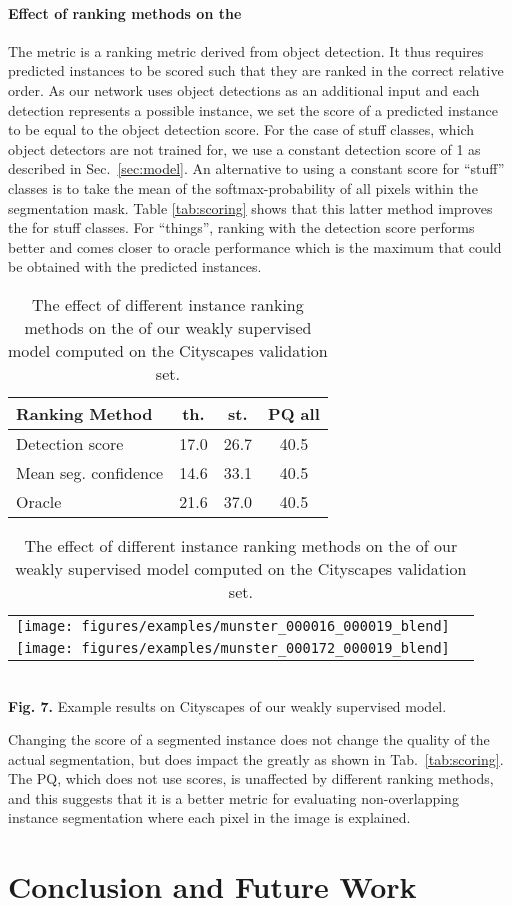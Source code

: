 \documentclass[runningheads]{llncs}
\begin{document}
\paragraph{Effect of ranking methods on the }
The  metric is a ranking metric derived from object detection.
It thus requires predicted instances to be scored such that they are ranked in the correct relative order.
As our network uses object detections as an additional input and each detection represents a possible instance, we set the score of a predicted instance to be equal to the object detection score.
For the case of stuff classes, which object detectors are not trained for, we use a constant detection score of 1 as described in Sec.~\ref{sec:model}.
An alternative to using a constant score for ``stuff'' classes is to take the mean of the softmax-probability of all pixels within the segmentation mask.
Table \ref{tab:scoring} shows that this latter method improves the  for stuff classes.
For ``things'', ranking with the detection score performs better and comes closer to oracle performance which is the maximum  that could be obtained with the predicted instances.

\begin{table}[t]
	\parbox{.48\linewidth}{

	\caption{The effect of different instance ranking methods on the  of our weakly supervised model computed on the Cityscapes validation set.}
	\label{tab:scoring}
	\begin{tabularx}{1\linewidth}{Xccc}
		\toprule
		Ranking Method          &  th. &  st. & PQ all \\ \midrule
		Detection score         & 17.0      & 26.7     & 40.5   \\
		Mean seg. confidence & 14.6      & 33.1     & 40.5   \\
		Oracle                  & 21.6      & 37.0     & 40.5   \\ \bottomrule
	\end{tabularx}

	}
	\hfill
	\parbox{.48\linewidth}{
			\centering
			\label{my-label}
			\begin{tabular}{cc}
				\texttt{[image: figures/examples/munster\_000016\_000019\_blend]} \\
				\texttt{[image: figures/examples/munster\_000172\_000019\_blend]}
			\end{tabular}
			\\
			\textbf{Fig. 7.} Example results on Cityscapes of our weakly supervised model.
	}
\end{table} 
Changing the score of a segmented instance does not change the quality of the actual segmentation, but does impact the  greatly as shown in Tab.~\ref{tab:scoring}.
The PQ, which does not use scores, is unaffected by different ranking methods, and this suggests that it is a better metric for evaluating non-overlapping instance segmentation where each pixel in the image is explained. \section{Conclusion and Future Work}
\end{document}
